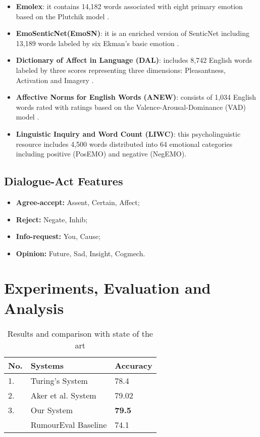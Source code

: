 \documentclass[sigconf]{acmart}
\begin{document}
\begin{itemize}
\item[]{\bf Emolex}: it contains 14,182 words associated with eight primary emotion based on the Plutchik model \cite{mohammad2013crowdsourcing,plutchik2001nature}.\item[]{\bf EmoSenticNet(EmoSN)}: it is an enriched version of SenticNet \cite{cambria2014senticnet} including 13,189 words labeled by six Ekman's basic emotion \cite{poria2013enhanced,ekman1992argument}.
\item[]{\bf Dictionary of Affect in Language (DAL)}: includes 8,742 English words labeled by three scores representing three dimensions: Pleasantness, Activation and Imagery \cite{whissell2009using}.
\item[]{\bf Affective Norms for English Words (ANEW)}: 
consists of 1,034 English words \cite{bradley1999affective} rated with ratings based on the 
Valence-Arousal-Dominance (VAD) 
model \cite{osgood_measurement_1957}.
\item[]{\bf Linguistic Inquiry and Word Count (LIWC)}: this psycholinguistic resource \cite{pennebaker2001linguistic} includes 4,500 words distributed into 64 emotional categories including positive (PosEMO) and negative (NegEMO). 
\end{itemize}

\subsection{Dialogue-Act Features}


\begin{itemize}
\item[]{\bf Agree-accept:} Assent, Certain, Affect;
\item[]{\bf Reject:} Negate, Inhib;
\item[]{\bf Info-request:} You, Cause;
\item[]{\bf Opinion:} Future, Sad, Insight, Cogmech.
\end{itemize}

\section{Experiments, Evaluation and Analysis}


\begin{table}
\begin{center}
\begin{tabular}{ p{0.5cm}p{4cm}p{1.5cm}  }
 \hline
   \textbf{No.} & \textbf{Systems} & \textbf{Accuracy} \\
 \hline
 1. & Turing's System & 78.4 \\
 2. & Aker et al. System & 79.02 \\
 3. & Our System & \textbf{79.5} \\
 \hline
 & RumourEval Baseline & 74.1\\
 \hline
\end{tabular}
\end{center}
\caption{\label{performance-comparison} Results and comparison with state of the art}
\end{table}
\end{document}
